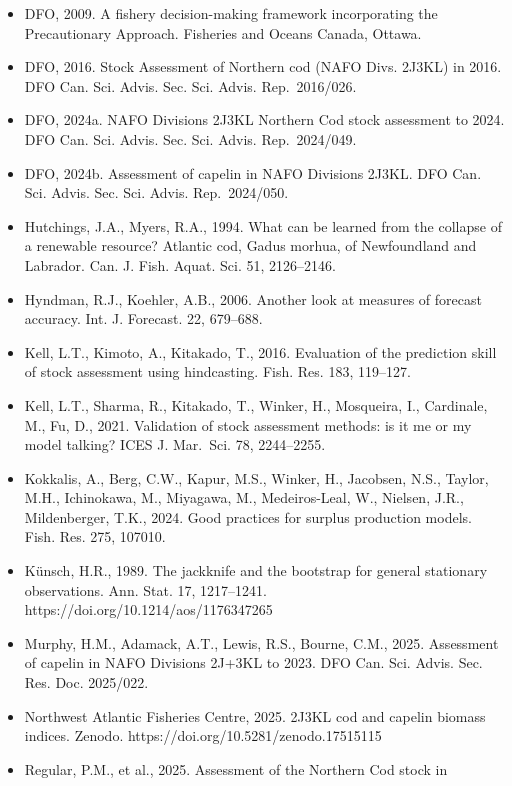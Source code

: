 \documentclass[11pt]{article}
\begin{document}
\begin{itemize}
\item
  DFO, 2009. A fishery decision-making framework incorporating the
  Precautionary Approach. Fisheries and Oceans Canada, Ottawa.
\item
  DFO, 2016. Stock Assessment of Northern cod (NAFO Divs. 2J3KL) in
  2016. DFO Can. Sci. Advis. Sec. Sci. Advis. Rep.~2016/026.
\item
  DFO, 2024a. NAFO Divisions 2J3KL Northern Cod stock assessment to
  2024. DFO Can. Sci. Advis. Sec. Sci. Advis. Rep.~2024/049.
\item
  DFO, 2024b. Assessment of capelin in NAFO Divisions 2J3KL. DFO Can.
  Sci. Advis. Sec. Sci. Advis. Rep.~2024/050.
\item
  Hutchings, J.A., Myers, R.A., 1994. What can be learned from the
  collapse of a renewable resource? Atlantic cod, Gadus morhua, of
  Newfoundland and Labrador. Can. J. Fish. Aquat. Sci. 51, 2126--2146.
\item
  Hyndman, R.J., Koehler, A.B., 2006. Another look at measures of
  forecast accuracy. Int. J. Forecast. 22, 679--688.
\item
  Kell, L.T., Kimoto, A., Kitakado, T., 2016. Evaluation of the
  prediction skill of stock assessment using hindcasting. Fish. Res.
  183, 119--127.
\item
  Kell, L.T., Sharma, R., Kitakado, T., Winker, H., Mosqueira, I.,
  Cardinale, M., Fu, D., 2021. Validation of stock assessment methods:
  is it me or my model talking? ICES J. Mar.~Sci. 78, 2244--2255.
\item
  Kokkalis, A., Berg, C.W., Kapur, M.S., Winker, H., Jacobsen, N.S.,
  Taylor, M.H., Ichinokawa, M., Miyagawa, M., Medeiros-Leal, W.,
  Nielsen, J.R., Mildenberger, T.K., 2024. Good practices for surplus
  production models. Fish. Res. 275, 107010.
\item
  Künsch, H.R., 1989. The jackknife and the bootstrap for general
  stationary observations. Ann. Stat. 17, 1217--1241.
  https://doi.org/10.1214/aos/1176347265
\item
  Murphy, H.M., Adamack, A.T., Lewis, R.S., Bourne, C.M., 2025.
  Assessment of capelin in NAFO Divisions 2J+3KL to 2023. DFO Can. Sci.
  Advis. Sec. Res. Doc. 2025/022.
\item
  Northwest Atlantic Fisheries Centre, 2025. 2J3KL cod and capelin
  biomass indices. Zenodo. https://doi.org/10.5281/zenodo.17515115
\item
  Regular, P.M., et al., 2025. Assessment of the Northern Cod stock in

\end{itemize}
\end{document}
